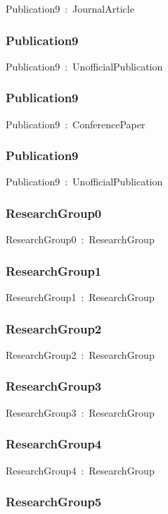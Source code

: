 \documentclass{article}
\begin{document}
Publication9~:~JournalArticle

\subsubsection*{Publication9}

Publication9~:~UnofficialPublication

\subsubsection*{Publication9}

Publication9~:~ConferencePaper

\subsubsection*{Publication9}

Publication9~:~UnofficialPublication

\subsubsection*{ResearchGroup0}

ResearchGroup0~:~ResearchGroup

\subsubsection*{ResearchGroup1}

ResearchGroup1~:~ResearchGroup

\subsubsection*{ResearchGroup2}

ResearchGroup2~:~ResearchGroup

\subsubsection*{ResearchGroup3}

ResearchGroup3~:~ResearchGroup

\subsubsection*{ResearchGroup4}

ResearchGroup4~:~ResearchGroup

\subsubsection*{ResearchGroup5}
\end{document}
